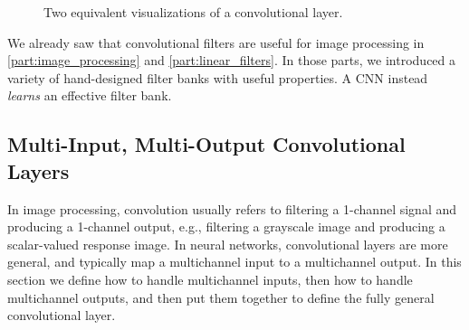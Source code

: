 \begin{figure}[h!]
\begin{minipage}{0.45\linewidth}
    \end{minipage}
    \caption{Two equivalent visualizations of a convolutional layer.}
    \label{fig:convolutional_neural_nets:conv_matrix_vs_net}
\end{figure}

We already saw that convolutional filters are useful for image processing in \partsref \ref{part:image_processing} and \ref{part:linear_filters}. In those parts, we introduced a variety of hand-designed filter banks with useful properties. A CNN instead \textit{learns} an effective filter bank.


\subsection{Multi-Input, Multi-Output Convolutional Layers}
In image processing, convolution usually refers to filtering a 1-channel signal and producing a 1-channel output, e.g., filtering a grayscale image and producing a scalar-valued response image. In neural networks, convolutional layers are more general, and typically map a multichannel input to a multichannel output. In this section we define how to handle multichannel inputs, then how to handle multichannel outputs, and then put them together to define the fully general convolutional layer.

